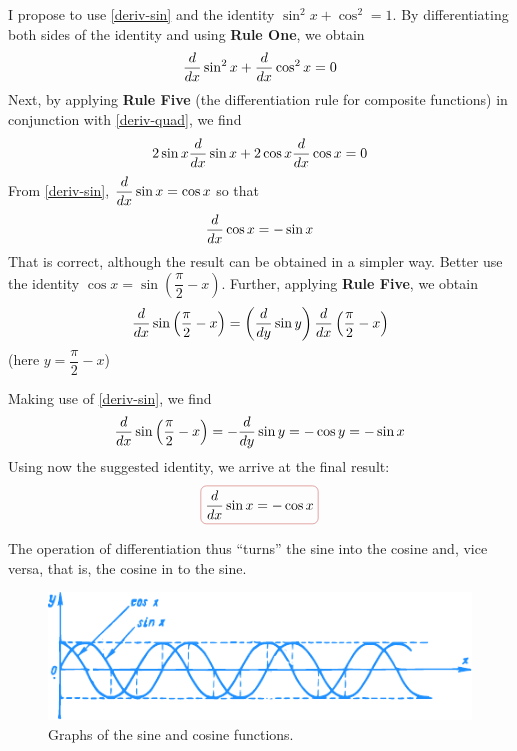 \rdr I propose to use \eqref{deriv-sin} and the identity $\sin^{2} x +  \cos^{2} = 1$. By differentiating both sides of the identity and using \textbf{Rule One}, we obtain
\begin{equation*}%
\ddx \sin^{2} x + \ddx \cos^{2} x = 0
\end{equation*}
Next, by applying \textbf{Rule Five} (the differentiation rule for composite functions) in conjunction with \eqref{deriv-quad}, we find
\begin{equation*}%
2 \sin x \ddx \sin x + 2 \cos x \ddx \cos x = 0
\end{equation*}
From \eqref{deriv-sin}, $\dfrac{d}{dx} \sin x= \cos x$ so that
\begin{equation*}%
\ddx \cos x = - \sin x 
\end{equation*}
\athr That is correct, although the result can be obtained in a simpler way. Better use the identity $\cos x = \sin \left(\dfrac{\pi}{2} -x \right)$. Further, applying \textbf{Rule Five}, we obtain
\begin{equation*}%
\ddx  \sin \left(\dfrac{\pi}{2} -x \right) = \left(\dfrac{d}{dy} \sin y \right) \ddx  \left(\dfrac{\pi}{2} -x \right)
\end{equation*}
(here  $y = \dfrac{\pi}{2} -x$)

Making use of \eqref{deriv-sin}, we find
\begin{equation*}%
\ddx  \sin \left(\dfrac{\pi}{2} -x \right) = - \dfrac{d}{dy} \sin y = - \cos y = - \sin x
\end{equation*}
Using now the suggested identity, we arrive at the final result:
\begin{equation}%
\boxed{\ddx  \sin x = - \cos x }
\label{deriv-sin}
\end{equation}

\rdr The operation of differentiation thus ``turns'' the sine into the cosine and, vice versa, that is, the cosine in to	 the sine.

\begin{figure}[!ht]%
\centering
\includegraphics[width=\textwidth]{figures/fig-43.pdf}
\caption{Graphs of the sine and cosine functions.}
\label{fig-43}
\end{figure}

